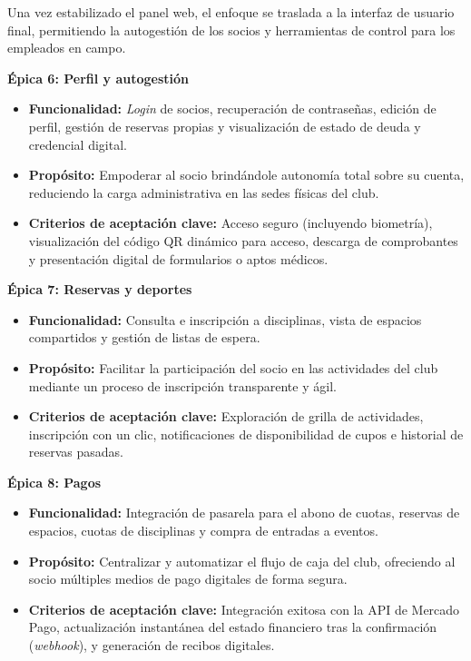 Una vez estabilizado el panel web, el enfoque se traslada a la interfaz de usuario final, permitiendo la autogestión de los socios y herramientas de control para los empleados en campo.

\textbf{Épica 6: Perfil y autogestión}
\begin{itemize}
    \item \textbf{Funcionalidad:} \textit{Login} de socios, recuperación de contraseñas, edición de perfil, gestión de reservas propias y visualización de estado de deuda y credencial digital.
    \item \textbf{Propósito:} Empoderar al socio brindándole autonomía total sobre su cuenta, reduciendo la carga administrativa en las sedes físicas del club.
    \item \textbf{Criterios de aceptación clave:} Acceso seguro (incluyendo biometría), visualización del código QR dinámico para acceso, descarga de comprobantes y presentación digital de formularios o aptos médicos.
\end{itemize}

\textbf{Épica 7: Reservas y deportes}
\begin{itemize}
    \item \textbf{Funcionalidad:} Consulta e inscripción a disciplinas, vista de espacios compartidos y gestión de listas de espera.
    \item \textbf{Propósito:} Facilitar la participación del socio en las actividades del club mediante un proceso de inscripción transparente y ágil.
    \item \textbf{Criterios de aceptación clave:} Exploración de grilla de actividades, inscripción con un clic, notificaciones de disponibilidad de cupos e historial de reservas pasadas.
\end{itemize}

\textbf{Épica 8: Pagos}
\begin{itemize}
    \item \textbf{Funcionalidad:} Integración de pasarela para el abono de cuotas, reservas de espacios, cuotas de disciplinas y compra de entradas a eventos.
    \item \textbf{Propósito:} Centralizar y automatizar el flujo de caja del club, ofreciendo al socio múltiples medios de pago digitales de forma segura.
    \item \textbf{Criterios de aceptación clave:} Integración exitosa con la API de Mercado Pago, actualización instantánea del estado financiero tras la confirmación (\textit{webhook}), y generación de recibos digitales.
\end{itemize}

